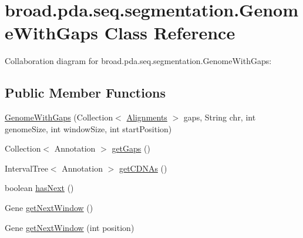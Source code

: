 \hypertarget{classbroad_1_1pda_1_1seq_1_1segmentation_1_1_genome_with_gaps}{\section{broad.\+pda.\+seq.\+segmentation.\+Genome\+With\+Gaps Class Reference}
\label{classbroad_1_1pda_1_1seq_1_1segmentation_1_1_genome_with_gaps}
}


Collaboration diagram for broad.\+pda.\+seq.\+segmentation.\+Genome\+With\+Gaps\+:
\subsection*{Public Member Functions}
\begin{DoxyCompactItemize}
\item 
\hyperlink{classbroad_1_1pda_1_1seq_1_1segmentation_1_1_genome_with_gaps_ac90360d08f6ac2fb48ac1d1a7723e93a}{Genome\+With\+Gaps} (Collection$<$ \hyperlink{classbroad_1_1pda_1_1datastructures_1_1_alignments}{Alignments} $>$ gaps, String chr, int genome\+Size, int window\+Size, int start\+Position)
\item 
Collection$<$ Annotation $>$ \hyperlink{classbroad_1_1pda_1_1seq_1_1segmentation_1_1_genome_with_gaps_a0a9b818dbd5a2021baf0a63be84e0140}{get\+Gaps} ()
\item 
Interval\+Tree$<$ Annotation $>$ \hyperlink{classbroad_1_1pda_1_1seq_1_1segmentation_1_1_genome_with_gaps_a9cdbea49c2cee0000d19d5f390841d16}{get\+C\+D\+N\+As} ()
\item 
boolean \hyperlink{classbroad_1_1pda_1_1seq_1_1segmentation_1_1_genome_with_gaps_a78e16556a221eb9636a6bf35484eca0c}{has\+Next} ()
\item 
Gene \hyperlink{classbroad_1_1pda_1_1seq_1_1segmentation_1_1_genome_with_gaps_a31b11e3fa798fbd8b22ad29a651e1526}{get\+Next\+Window} ()
\item 
Gene \hyperlink{classbroad_1_1pda_1_1seq_1_1segmentation_1_1_genome_with_gaps_a890dcbb2dc362feabcc00597a7693b23}{get\+Next\+Window} (int position)
\end{DoxyCompactItemize}


